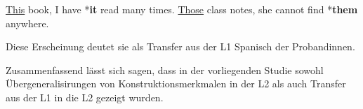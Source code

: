 \begin{exe}
    \ex \label{book2} \uline{This} book, I have *\textbf{it} read many times.
    \ex \label{notes} \uline{Those} class notes, she cannot find *\textbf{them} anywhere.
\end{exe}

Diese Erscheinung deutet sie als Transfer aus der L1 Spanisch der Probandinnen.
\cite[vgl. ``However, the near-native group is both accepting and producing pronouns (overt resumptive elements like clitics) with the specific topics there by exhibiting L1 influence.''][S.11]{Valenzuela05}

Zusammenfassend lässt sich sagen, dass in der vorliegenden Studie sowohl Übergeneralisirungen von Konstruktionsmerkmalen in der L2 als auch Transfer aus der L1 in die L2 gezeigt wurden.







